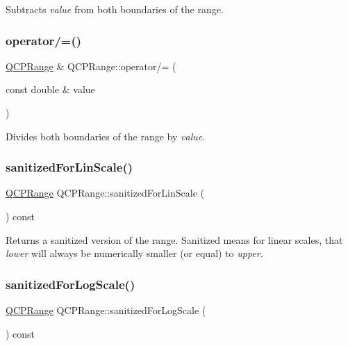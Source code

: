 Subtracts {\itshape value} from both boundaries of the range. \mbox{\label{class_q_c_p_range_a6137d8682b6835ace840730b4c1e2d63}} 
\subsubsection{\texorpdfstring{operator/=()}{operator/=()}}
{\footnotesize\ttfamily \mbox{\hyperlink{class_q_c_p_range}{Q\+C\+P\+Range}} \& Q\+C\+P\+Range\+::operator/= (\begin{DoxyParamCaption}\item[{const double \&}]{value }\end{DoxyParamCaption})\hspace{0.3cm}{\ttfamily [inline]}}

Divides both boundaries of the range by {\itshape value}. \mbox{\label{class_q_c_p_range_a808751fdd9b17ef52327ba011df2e5f1}} 
\subsubsection{\texorpdfstring{sanitized\+For\+Lin\+Scale()}{sanitizedForLinScale()}}
{\footnotesize\ttfamily \mbox{\hyperlink{class_q_c_p_range}{Q\+C\+P\+Range}} Q\+C\+P\+Range\+::sanitized\+For\+Lin\+Scale (\begin{DoxyParamCaption}{ }\end{DoxyParamCaption}) const}

Returns a sanitized version of the range. Sanitized means for linear scales, that {\itshape lower} will always be numerically smaller (or equal) to {\itshape upper}. \mbox{\label{class_q_c_p_range_a3d66288d66e1d6df3636075eb42502ee}} 
\subsubsection{\texorpdfstring{sanitized\+For\+Log\+Scale()}{sanitizedForLogScale()}}
{\footnotesize\ttfamily \mbox{\hyperlink{class_q_c_p_range}{Q\+C\+P\+Range}} Q\+C\+P\+Range\+::sanitized\+For\+Log\+Scale (\begin{DoxyParamCaption}{ }\end{DoxyParamCaption}) const}

